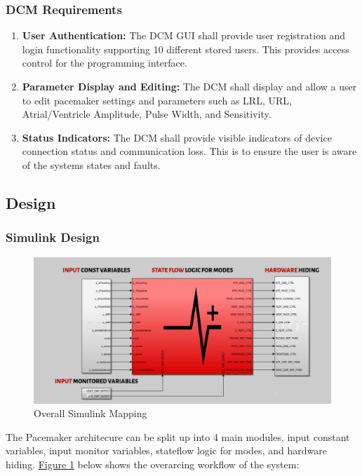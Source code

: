 \documentclass{article}
\newcounter{subsubsubsection}[subsubsection]
\begin{document}
\subsubsection{DCM Requirements}
\begin{enumerate}[label=]
    \item \textbf{User Authentication:} The DCM GUI shall provide user registration and login functionality supporting
    10 different stored users. This provides access control for the programming interface.
    \item \textbf{Parameter Display and Editing:} The DCM shall display and allow a user to edit pacemaker settings 
    and parameters such as LRL, URL, Atrial/Ventricle Amplitude, Pulse Width, and Sensitivity.
    \item \textbf{Status Indicators:} The DCM shall provide visible indicators of device connection status and communication loss. 
    This is to ensure the user is aware of the systems states and faults. 
\end{enumerate}

\newpage
\subsection{Design}
\label{dessec}

\subsubsection{Simulink Design}


\begin{tcolorbox}
    \begin{figure}[H]
        \includegraphics[width=\textwidth]{SimWholeView.png}
        \caption{Overall Simulink Mapping}
        \label{SimWholeView}
    \end{figure}
\end{tcolorbox}
The Pacemaker architecure can be split up into 4 main modules, input constant variables, 
input monitor variables, stateflow logic for modes, and hardware hiding. \hyperref[SimWholeView]{Figure 1} below shows the overarcing 
workflow of the system:
\end{document}
